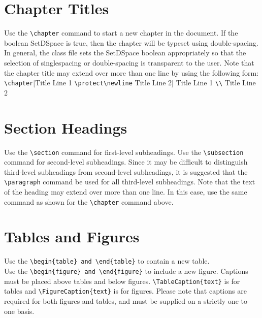 \documentclass[12pt,Bold,letterpaper,TexShade]{mcgilletdclass}
\begin{document}
\section{Chapter Titles}
Use the \verb=\chapter= command to start a new chapter in the document. If 
the boolean SetDSpace is true, then the chapter will
be typeset using double-spacing. In general, the class file sets the
SetDSpace boolean appropriately so that the selection of singlespacing
or double-spacing is transparent to the user.
Note that the chapter title may extend over more than one line
by using the following form:
\verb=\chapter=[Title Line 1 \verb=\protect\newline= Title Line 2]{%
Title Line 1 \verb=\\= Title Line 2}%
\section{Section Headings}
Use the \verb=\section= command for first-level subheadings. Use the 
\verb=\subsection= command for second-level subheadings. Since it
may be difficult to distinguish third-level subheadings from second-level
subheadings, it is suggested that the \verb=\paragraph= command be
used for all third-level subheadings. Note that the text of the heading
may extend over more than one line. In this case, use the same command
as shown for the \verb=\chapter= command above.
\section{Tables and Figures}
Use the \verb=\begin{table} and \end{table}= to contain a new table.\\
Use the \verb=\begin{figure} and \end{figure}= to include a new figure.
Captions must be placed above
tables and below figures. \verb=\TableCaption{text}= is for tables and 
\verb=\FigureCaption{text}= is for figures.  Please note that captions
are required for both figures and tables, and must be supplied on a 
strictly one-to-one basis. \\
\end{document}
